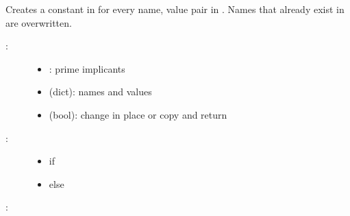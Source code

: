 \documentclass[letterpaper,10pt,english]{sphinxmanual}
\begin{document}
\begin{fulllineitems}
\label{\detokenize{PrimeImplicants:PyBoolNet.PrimeImplicants.create_constants}}
Creates a constant in  for every name, value pair in .
Names that already exist in  are overwritten.
\begin{description}
\item[{:}] \leavevmode\begin{itemize}
\item {} 
: prime implicants

\item {} 
 (dict): names and values

\item {} 
 (bool): change  in place or copy and return

\end{itemize}

\item[{:}] \leavevmode\begin{itemize}
\item {} 
 if 

\item {} 
 else

\end{itemize}

\end{description}

:

\begin{sphinxVerbatim}[commandchars=\\\{\}]
  
\end{sphinxVerbatim}

\end{fulllineitems}
\end{document}
